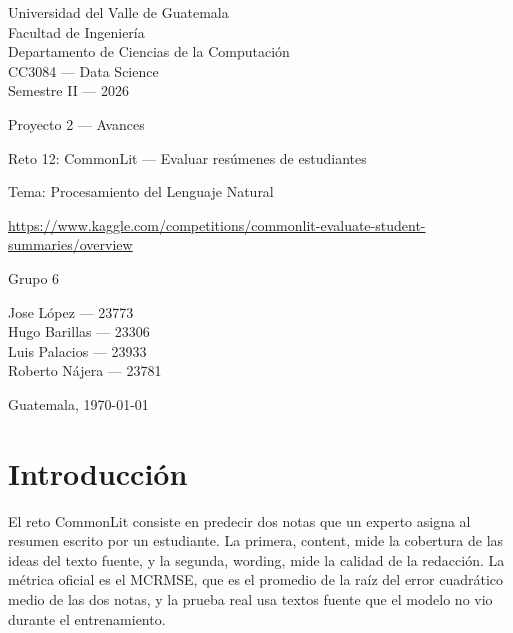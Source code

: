 \documentclass[11pt,a4paper]{article}
\begin{document}
\begin{titlepage}
\centering
{\large Universidad del Valle de Guatemala\\
Facultad de Ingeniería\\
Departamento de Ciencias de la Computación\\
CC3084 --- Data Science\\
Semestre II --- 2026\par}

\vspace{1.2cm}
\vspace{1.2cm}

{\LARGE Proyecto 2 --- Avances\par}
\vspace{0.8cm}
{\large Reto 12: CommonLit --- Evaluar resúmenes de estudiantes\par}
\vspace{0.3cm}
{\normalsize Tema: Procesamiento del Lenguaje Natural\par}
\vspace{0.3cm}
{\small \url{https://www.kaggle.com/competitions/commonlit-evaluate-student-summaries/overview}\par}

\vspace{1.5cm}
{\Large Grupo 6\par}
\vspace{0.4cm}
Jose López --- 23773\\
Hugo Barillas --- 23306\\
Luis Palacios --- 23933\\
Roberto Nájera --- 23781

\vfill
Guatemala, \today
\end{titlepage}

\tableofcontents
\newpage

\section{Introducción}

El reto CommonLit consiste en predecir dos notas que un experto asigna al resumen escrito por un estudiante. La primera, content, mide la cobertura de las ideas del texto fuente, y la segunda, wording, mide la calidad de la redacción. La métrica oficial es el MCRMSE, que es el promedio de la raíz del error cuadrático medio de las dos notas, y la prueba real usa textos fuente que el modelo no vio durante el entrenamiento.
\end{document}
